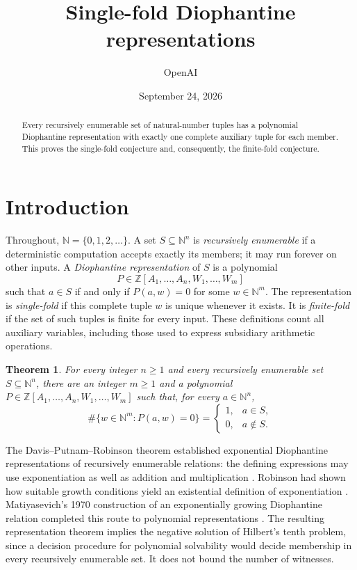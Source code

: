 \documentclass[11pt]{article}
\title{Single-fold Diophantine representations}
\author{OpenAI}
\date{September 24, 2026}
\newtheorem{theorem}{Theorem}[section]
\theoremstyle{definition}
\theoremstyle{remark}
\newcommand{\NN}{\mathbb N}
\newcommand{\ZZ}{\mathbb Z}
\begin{document}
\maketitle
\begin{abstract}
Every recursively enumerable set of natural-number tuples has a polynomial
Diophantine representation with exactly one complete auxiliary tuple for each
member. This proves the single-fold conjecture and, consequently, the finite-fold
conjecture.
\end{abstract}
\tableofcontents
\clearpage

\section{Introduction}
Throughout, $\NN=\{0,1,2,\ldots\}$. A set $S\subseteq\NN^n$ is
\emph{recursively enumerable} if a deterministic computation accepts exactly
its members; it may run forever on other inputs. A \emph{Diophantine
representation} of $S$ is a polynomial
\[
 P\in\ZZ[A_1,\ldots,A_n,W_1,\ldots,W_m]
\]
such that $a\in S$ if and only if $P(a,w)=0$ for some $w\in\NN^m$.
The representation is \emph{single-fold} if this complete tuple $w$ is unique
whenever it exists. It is \emph{finite-fold} if the set of such tuples is finite
for every input. These definitions count all auxiliary variables, including
those used to express subsidiary arithmetic operations.

\begin{theorem}\label{thm:main}
For every integer $n\ge1$ and every recursively enumerable set
$S\subseteq\NN^n$, there are an integer $m\ge1$ and a polynomial
$P\in\ZZ[A_1,\ldots,A_n,W_1,\ldots,W_m]$ such that, for every $a\in\NN^n$,
\[
 \#\{w\in\NN^m:P(a,w)=0\}=
 \begin{cases}1,&a\in S,\\0,&a\notin S.\end{cases}
\]
\end{theorem}

The Davis--Putnam--Robinson theorem established exponential Diophantine
representations of recursively enumerable relations: the defining expressions
may use exponentiation as well as addition and multiplication
\cite[Section~1]{dpr1961}. Robinson had shown how suitable growth conditions
yield an existential definition of exponentiation
\cite[Section~3]{robinson1952}. Matiyasevich's 1970 construction of an
exponentially growing Diophantine relation completed this route to polynomial
representations \cite[Sections~1 and~3]{mati1970}. The resulting representation
theorem implies the negative solution of Hilbert's tenth problem, since a
decision procedure for polynomial solvability would decide membership in every
recursively enumerable set. It does not bound the number of witnesses.
\end{document}
